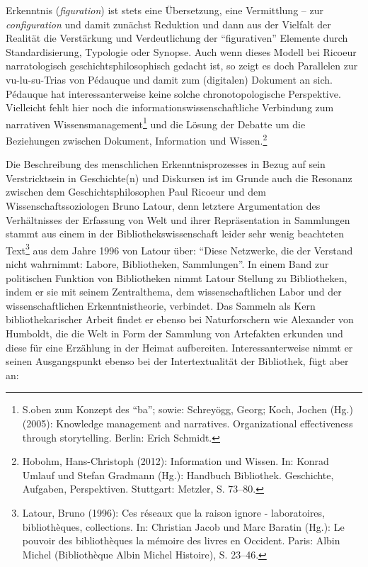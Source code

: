 Erkenntnis (\emph{figuration}) ist stets eine Übersetzung, eine
Vermittlung -- zur \emph{configuration} und damit zunächst Reduktion und
dann aus der Vielfalt der Realität die Verstärkung und Verdeutlichung
der \enquote{figurativen} Elemente durch Standardisierung, Typologie oder
Synopse. Auch wenn dieses Modell bei Ricoeur narratologisch
geschichtsphilosophisch gedacht ist, so zeigt es doch Parallelen zur
vu-lu-su-Trias von Pédauque und damit zum (digitalen) Dokument an sich.
Pédauque hat interessanterweise keine solche chronotopologische
Perspektive. Vielleicht fehlt hier noch die
informationswissenschaftliche Verbindung zum narrativen
Wissensmanagement\footnote{S.oben zum Konzept des \enquote{ba}; sowie:
  Schreyögg, Georg; Koch, Jochen (Hg.) (2005): Knowledge management and
  narratives. Organizational effectiveness through storytelling. Berlin:
  Erich Schmidt.} und die Lösung der Debatte um die Beziehungen zwischen
Dokument, Information und Wissen.\footnote{Hobohm, Hans-Christoph
  (2012): Information und Wissen. In: Konrad Umlauf und Stefan Gradmann
  (Hg.): Handbuch Bibliothek. Geschichte, Aufgaben, Perspektiven.
  Stuttgart: Metzler, S. 73--80.}

Die Beschreibung des menschlichen Erkenntnisprozesses in Bezug auf sein
Verstricktsein in Geschichte(n) und Diskursen ist im Grunde auch die
Resonanz zwischen dem Geschichtsphilosophen Paul Ricoeur und dem
Wissenschaftssoziologen Bruno Latour, denn letztere Argumentation des
Verhältnisses der Erfassung von Welt und ihrer Repräsentation in
Sammlungen stammt aus einem in der Bibliothekswissenschaft leider sehr
wenig beachteten Text\footnote{Latour, Bruno (1996): Ces réseaux que la
  raison ignore - laboratoires, bibliothèques, collections. In:
  Christian Jacob und Marc Baratin (Hg.): Le pouvoir des bibliothèques
  la mémoire des livres en Occident. Paris: Albin Michel (Bibliothèque
  Albin Michel Histoire), S. 23--46.} aus dem Jahre 1996 von Latour
über: \enquote{Diese Netzwerke, die der Verstand nicht wahrnimmt: Labore,
Bibliotheken, Sammlungen}. In einem Band zur politischen Funktion von
Bibliotheken nimmt Latour Stellung zu Bibliotheken, indem er sie mit
seinem Zentralthema, dem wissenschaftlichen Labor und der
wissenschaftlichen Erkenntnistheorie, verbindet. Das Sammeln als Kern
bibliothekarischer Arbeit findet er ebenso bei Naturforschern wie
Alexander von Humboldt, die die Welt in Form der Sammlung von Artefakten
erkunden und diese für eine Erzählung in der Heimat aufbereiten.
Interessanterweise nimmt er seinen Ausgangspunkt ebenso bei der
Intertextualität der Bibliothek, fügt aber an:

